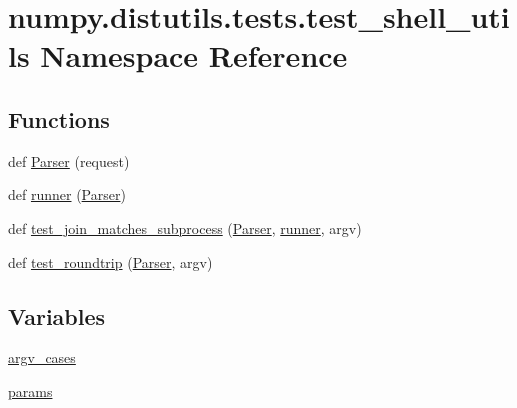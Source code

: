 \hypertarget{namespacenumpy_1_1distutils_1_1tests_1_1test__shell__utils}{}\section{numpy.\+distutils.\+tests.\+test\+\_\+shell\+\_\+utils Namespace Reference}
\label{namespacenumpy_1_1distutils_1_1tests_1_1test__shell__utils}
\subsection*{Functions}
\begin{DoxyCompactItemize}
\item 
def \hyperlink{namespacenumpy_1_1distutils_1_1tests_1_1test__shell__utils_a6fcfdb82cb3847e96157f044e38ccc66}{Parser} (request)
\item 
def \hyperlink{namespacenumpy_1_1distutils_1_1tests_1_1test__shell__utils_a8ce3f56c3a98b1f8fd4185b583704856}{runner} (\hyperlink{namespacenumpy_1_1distutils_1_1tests_1_1test__shell__utils_a6fcfdb82cb3847e96157f044e38ccc66}{Parser})
\item 
def \hyperlink{namespacenumpy_1_1distutils_1_1tests_1_1test__shell__utils_abdaca3c5d0856d7e797b9c29602ff73a}{test\+\_\+join\+\_\+matches\+\_\+subprocess} (\hyperlink{namespacenumpy_1_1distutils_1_1tests_1_1test__shell__utils_a6fcfdb82cb3847e96157f044e38ccc66}{Parser}, \hyperlink{namespacenumpy_1_1distutils_1_1tests_1_1test__shell__utils_a8ce3f56c3a98b1f8fd4185b583704856}{runner}, argv)
\item 
def \hyperlink{namespacenumpy_1_1distutils_1_1tests_1_1test__shell__utils_ab53ca6346650570498214565bd71a463}{test\+\_\+roundtrip} (\hyperlink{namespacenumpy_1_1distutils_1_1tests_1_1test__shell__utils_a6fcfdb82cb3847e96157f044e38ccc66}{Parser}, argv)
\end{DoxyCompactItemize}
\subsection*{Variables}
\begin{DoxyCompactItemize}
\item 
\hyperlink{namespacenumpy_1_1distutils_1_1tests_1_1test__shell__utils_ad2a9f9766da2f94a94c300ed88c860f6}{argv\+\_\+cases}
\item 
\hyperlink{namespacenumpy_1_1distutils_1_1tests_1_1test__shell__utils_acda3ab02334e88c94fdb5bf130b2a85d}{params}
\end{DoxyCompactItemize}


